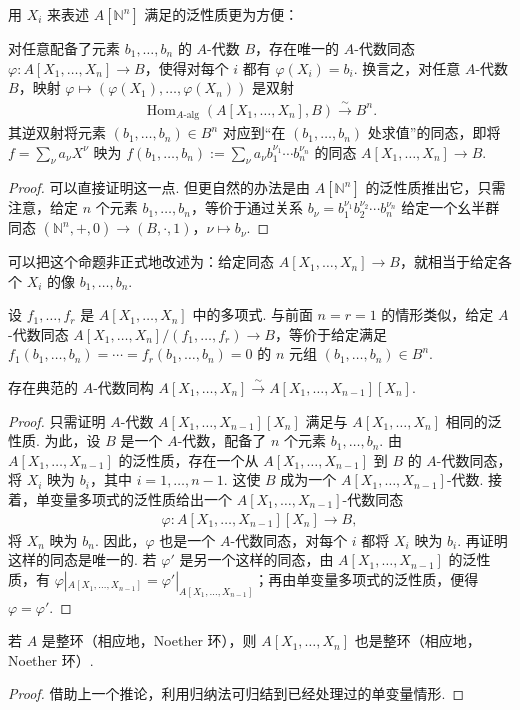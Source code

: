 用 $X_i$ 来表述 $A[\mathbb N^n]$ 满足的泛性质更为方便：
\begin{proposition*}
对任意配备了元素 $b_1,\ldots,b_n$ 的 $A$-代数 $B$，存在唯一的 $A$-代数同态 $\varphi\colon A[X_1,\ldots,X_n]\longrightarrow B$，使得对每个 $i$ 都有 $\varphi(X_i)=b_i$. 换言之，对任意 $A$-代数 $B$，映射 $\varphi\longmapsto(\varphi(X_1),\ldots,\varphi(X_n))$ 是双射
\begin{align*}
\operatorname{Hom}_{A\text{-}\mathrm{alg}}(A[X_1,\ldots,X_n],B)\xrightarrow{\sim}B^n.
\end{align*}
其逆双射将元素 $(b_1,\ldots,b_n)\in B^n$ 对应到``在 $(b_1,\ldots,b_n)$ 处求值''的同态，即将 $f=\sum_\nu a_\nu X^\nu$ 映为 $f(b_1,\ldots,b_n):=\sum_\nu a_\nu b_1^{\nu_1}\cdots b_n^{\nu_n}$ 的同态 $A[X_1,\ldots,X_n]\longrightarrow B$.
\end{proposition*}
\begin{proof}
可以直接证明这一点. 但更自然的办法是由 $A[\mathbb N^n]$ 的泛性质推出它，只需注意，给定 $n$ 个元素 $b_1,\ldots,b_n$，等价于通过关系 $b_\nu=b_1^{\nu_1}b_2^{\nu_2}\cdots b_n^{\nu_n}$ 给定一个幺半群同态 $(\mathbb N^n,+,0)\longrightarrow(B,\cdot,1)$，$\nu\longmapsto b_\nu$.
\end{proof}
可以把这个命题非正式地改述为：给定同态 $A[X_1,\ldots,X_n]\longrightarrow B$，就相当于给定各个 $X_i$ 的像 $b_1,\ldots,b_n$.
\begin{remark*}
设 $f_1,\ldots,f_r$ 是 $A[X_1,\ldots,X_n]$ 中的多项式. 与前面 $n=r=1$ 的情形类似，给定 $A$-代数同态 $A[X_1,\ldots,X_n]/(f_1,\ldots,f_r)\longrightarrow B$，等价于给定满足 $f_1(b_1,\ldots,b_n)=\cdots=f_r(b_1,\ldots,b_n)=0$ 的 $n$ 元组 $(b_1,\ldots,b_n)\in B^n$.
\end{remark*}
\begin{corollary*}
存在典范的 $A$-代数同构 $A[X_1,\ldots,X_n]\xrightarrow{\sim}A[X_1,\ldots,X_{n-1}][X_n]$.
\end{corollary*}
\begin{proof}
只需证明 $A$-代数 $A[X_1,\ldots,X_{n-1}][X_n]$ 满足与 $A[X_1,\ldots,X_n]$ 相同的泛性质. 为此，设 $B$ 是一个 $A$-代数，配备了 $n$ 个元素 $b_1,\ldots,b_n$. 由 $A[X_1,\ldots,X_{n-1}]$ 的泛性质，存在一个从 $A[X_1,\ldots,X_{n-1}]$ 到 $B$ 的 $A$-代数同态，将 $X_i$ 映为 $b_i$，其中 $i=1,\ldots,n-1$. 这使 $B$ 成为一个 $A[X_1,\ldots,X_{n-1}]$-代数. 接着，单变量多项式的泛性质给出一个 $A[X_1,\ldots,X_{n-1}]$-代数同态
\begin{align*}
\varphi\colon A[X_1,\ldots,X_{n-1}][X_n]\longrightarrow B,
\end{align*}
将 $X_n$ 映为 $b_n$. 因此，$\varphi$ 也是一个 $A$-代数同态，对每个 $i$ 都将 $X_i$ 映为 $b_i$. 再证明这样的同态是唯一的. 若 $\varphi'$ 是另一个这样的同态，由 $A[X_1,\ldots,X_{n-1}]$ 的泛性质，有 $\varphi|_{A[X_1,\ldots,X_{n-1}]}=\varphi'|_{A[X_1,\ldots,X_{n-1}]}$；再由单变量多项式的泛性质，便得 $\varphi=\varphi'$.
\end{proof}
\begin{corollary*}
若 $A$ 是整环（相应地，Noether 环），则 $A[X_1,\ldots,X_n]$ 也是整环（相应地，Noether 环）.
\end{corollary*}
\begin{proof}
借助上一个推论，利用归纳法可归结到已经处理过的单变量情形.
\end{proof}
